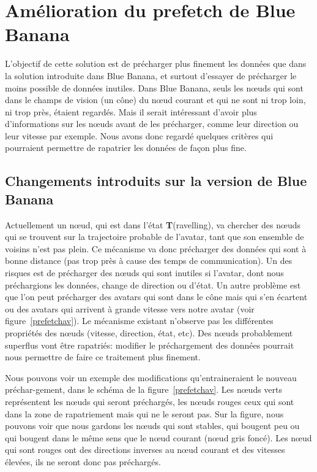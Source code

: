 \section{Amélioration du prefetch de Blue Banana}

L'objectif de cette solution est de précharger plus finement les données que dans la solution introduite dans Blue Banana, et surtout d'essayer de précharger le moins possible de données inutiles. Dans Blue Banana, seuls les nœuds qui sont dans le champs de vision (un cône) du nœud courant et qui ne sont ni trop loin, ni trop près, étaient regardés. Mais il serait intéressant d'avoir plus d'informations sur les nœuds avant de les précharger, comme leur direction ou leur vitesse par exemple. Nous avons donc regardé quelques critères qui pourraient permettre de rapatrier les données de façon plus fine.

\subsection{Changements introduits sur la version de Blue Banana}


\par Actuellement un nœud, qui est dans l'état \textbf{T}(ravelling), va chercher des nœuds qui se trouvent sur la trajectoire probable de l'avatar, tant que son ensemble de voisins n'est pas plein. Ce mécanisme va donc précharger des données qui sont à bonne distance (pas trop près à cause des temps de communication). Un des risques est de précharger des nœuds qui sont inutiles si l'avatar, dont nous préchargions les données, change de direction ou d'état. Un autre problème est que l'on peut précharger des avatars qui sont dans le cône mais qui s'en écartent ou des avatars qui arrivent à grande vitesse vers notre avatar (voir figure~\ref{prefetchav}). Le mécanisme existant n'observe pas les différentes propriétés des nœuds (vitesse, direction, état, etc). Des nœuds probablement superflus vont être rapatriés: modifier le préchargement des données pourrait nous permettre de faire ce traitement plus finement.

\par  Nous pouvons voir un exemple des modifications qu'entraineraient le nouveau préchar-gement, dans le schéma de la figure~\ref{prefetchav}. Les nœuds verts représentent les nœuds qui seront préchargés, les nœuds rouges ceux qui sont dans la zone de rapatriement mais qui ne le seront pas. Sur la figure, nous pouvons voir que nous gardons les nœuds qui sont stables, qui bougent peu ou qui bougent dans le même sens que le nœud courant (nœud gris foncé). Les nœud qui sont rouges ont des directions inverses au nœud courant et des vitesses élevées, ils ne seront donc pas préchargés.

